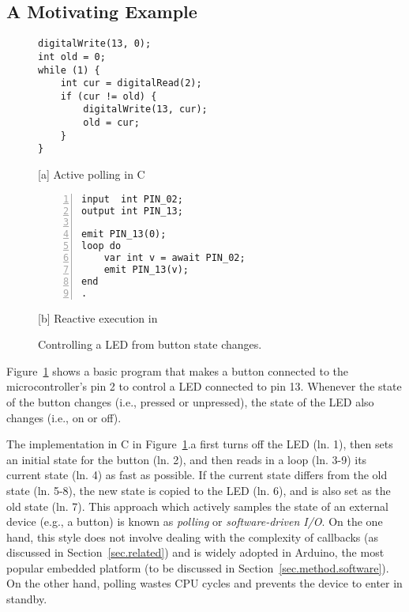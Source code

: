 \subsection{A Motivating Example}
\label{sec.ceu}

{\linespread{1}
\begin{figure}[t]
\begin{minipage}[t]{0.50\linewidth}
\begin{lstlisting}[xrightmargin=1cm]
digitalWrite(13, 0);
int old = 0;
while (1) {
    int cur = digitalRead(2);
    if (cur != old) {
        digitalWrite(13, cur);
        old = cur;
    }
}

\end{lstlisting}
\centering\small{[a] Active polling in C}
\end{minipage}
%
\begin{minipage}[t]{0.45\linewidth}
\begin{lstlisting}[numbers=left]
input  int PIN_02;
output int PIN_13;

emit PIN_13(0);
loop do
    var int v = await PIN_02;
    emit PIN_13(v);
end
.
\end{lstlisting}
\centering\small{[b] Reactive execution in \CEU}
\end{minipage}
\caption{ Controlling a LED from button state changes.
\label{lst.basic}
}
\end{figure}
}

Figure~\ref{lst.basic} shows a basic program that makes a button connected
to the microcontroller's pin 2 to control a LED connected to pin 13.
Whenever the state of the button changes (i.e., pressed or unpressed), the
state of the LED also changes (i.e., on or off).

The implementation in C in Figure~\ref{lst.basic}.a first turns off the LED
(ln. 1), then sets an initial state for the button (ln. 2), and then reads in a
loop (ln. 3-9) its current state (ln. 4) as fast as possible.
If the current state differs from the old state (ln. 5-8), the new state is
copied to the LED (ln. 6), and is also set as the old state (ln. 7).
%
This approach which actively samples the state of an external device (e.g., a
button) is known as \emph{polling} or \emph{software-driven I/O}.
%
On the one hand, this style does not involve dealing with the complexity of
callbacks (as discussed in Section~\ref{sec.related}) and is widely adopted in
Arduino, the most popular embedded platform (to be discussed in
Section~\ref{sec.method.software}).
On the other hand, polling wastes CPU cycles and prevents the device to enter in
standby.

